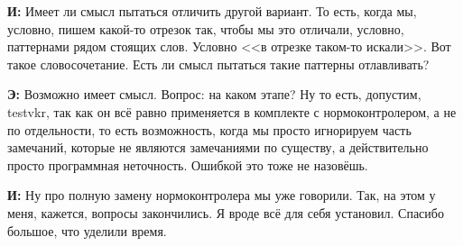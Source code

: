\textbf{И: }Имеет ли смысл пытаться отличить другой вариант. То есть, когда мы, условно, пишем какой-то отрезок так, чтобы мы это отличали, условно, паттернами рядом стоящих слов. Условно <<в отрезке таком-то искали>>. Вот такое словосочетание. Есть ли смысл пытаться такие паттерны отлавливать?

\textbf{Э: }Возможно имеет смысл. Вопрос: на каком этапе? Ну то есть, допустим, testvkr, так как он всё равно применяется в комплекте с нормоконтролером, а не по отдельности, то есть возможность, когда мы просто игнорируем часть замечаний, которые не являются замечаниями по существу, а действительно просто программная неточность. Ошибкой это тоже не назовёшь.

\textbf{И: }Ну про полную замену нормоконтролера мы уже говорили. Так, на этом у меня, кажется, вопросы закончились. Я вроде всё для себя установил. Спасибо большое, что уделили время.

%

\clearpage
